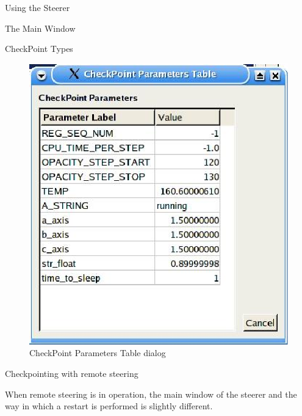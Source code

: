 \documentclass[a4paper,twoside]{article}
\begin{document}
\begin{section}{Using the Steerer}
\begin{subsection}{The Main Window}
\begin{subsubsection}{CheckPoint Types}
\begin{figure}
\centerline{\includegraphics{chk_params.eps}}
\caption{CheckPoint Parameters Table dialog}
\label{fig:chk_params_dialog}
\end{figure}

Checkpointing with remote steering

When remote steering is in operation, the main window of the steerer
and the way in which a restart is performed is slightly different.


\end{subsubsection}
\end{subsection}
\end{section}
\end{document}
